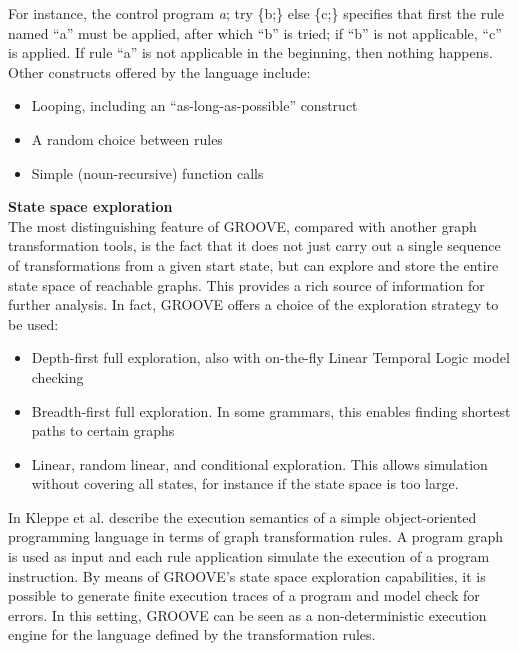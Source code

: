 For instance, the control program \emph{a}; try \{b;\} else \{c;\} speciﬁes that ﬁrst the rule named \enquote{a} must be applied, after which \enquote{b} is tried; if \enquote{b} is not applicable, \enquote{c} is applied. If rule \enquote{a} is not applicable in the beginning, then nothing happens. Other constructs offered by the language include:
\begin{itemize}
\item Looping, including an \enquote{as-long-as-possible} construct
\item A random choice between rules
\item Simple (noun-recursive) function calls
\end{itemize}
\textbf{State space exploration}\\ 
The most distinguishing feature of GROOVE, compared with another graph transformation tools, is the fact that it does not just carry out a single sequence of transformations from a given start state, but can explore and store the entire state space of reachable graphs. This provides a rich source of information for further analysis. In fact, GROOVE offers a choice of the exploration strategy to be used:
\begin{itemize}
\item Depth-ﬁrst full exploration, also with on-the-ﬂy Linear Temporal Logic model checking
\item Breadth-ﬁrst full exploration. In some grammars, this enables ﬁnding shortest paths to certain graphs
\item Linear, random linear, and conditional exploration. This allows simulation without covering all states, for instance if the state space is too large.
\end{itemize}
In \cite{lucassen2016improving} Kleppe et al. describe the execution semantics of a simple object-oriented programming language in terms of graph transformation rules. A program graph is used as input and each rule application simulate the execution of a program instruction. By means of GROOVE’s state space exploration capabilities, it is possible to generate ﬁnite execution traces of a program and model check for errors. In this setting, GROOVE can be seen as a non-deterministic execution engine for the language deﬁned by the transformation rules.

